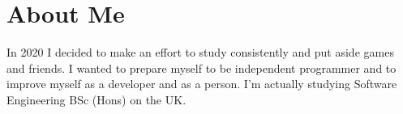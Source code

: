 \section[\faUser]{About Me}
In 2020 I decided to make an effort to study consistently and put aside games and friends. I wanted to prepare myself to be independent programmer and to improve myself as a developer and as a person. I'm actually studying Software Engineering BSc (Hons) on the UK.
